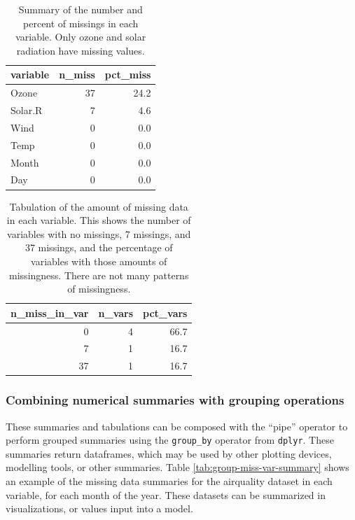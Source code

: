 \documentclass[]{article}
\theoremstyle{definition}
\theoremstyle{definition}
\theoremstyle{definition}
\theoremstyle{remark}
\begin{document}
\begin{table}[!h]

\caption{\label{tab:miss-var-summary}Summary of the number and percent of missings in each variable. Only ozone and solar radiation have missing values.}
\centering
\begin{tabular}[t]{lrr}
\toprule
variable & n\_miss & pct\_miss\\
\midrule
Ozone & 37 & 24.2\\
Solar.R & 7 & 4.6\\
Wind & 0 & 0.0\\
Temp & 0 & 0.0\\
Month & 0 & 0.0\\
Day & 0 & 0.0\\
\bottomrule
\end{tabular}
\end{table}

\begin{table}[!h]

\caption{\label{tab:miss-var-table}Tabulation of the amount of missing data in each variable. This shows the number of variables with no missings, 7 missings, and 37 missings, and the percentage of variables with those amounts of missingness. There are not many patterns of missingness.}
\centering
\begin{tabular}[t]{rrr}
\toprule
n\_miss\_in\_var & n\_vars & pct\_vars\\
\midrule
0 & 4 & 66.7\\
7 & 1 & 16.7\\
37 & 1 & 16.7\\
\bottomrule
\end{tabular}
\end{table}

\hypertarget{num-sum-w-group}{%
\subsubsection{Combining numerical summaries with grouping
operations}\label{num-sum-w-group}}

These summaries and tabulations can be composed with the ``pipe''
operator to perform grouped summaries using the \texttt{group\_by}
operator from \texttt{dplyr}. These summaries return dataframes, which
may be used by other plotting devices, modelling tools, or other
summaries. Table \ref{tab:group-miss-var-summary} shows an example of
the missing data summaries for the airquality dataset in each variable,
for each month of the year. These datasets can be summarized in
visualizations, or values input into a model.
\end{document}
